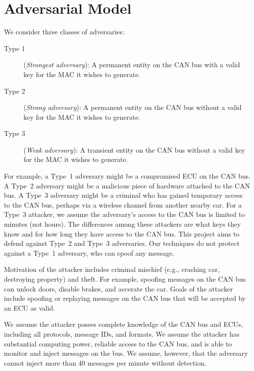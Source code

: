 \section{Adversarial Model}
\label{adversary}

We consider three classes of adversaries:

\begin{description}

	\item [Type 1]
	(\textit{Strongest adversary}): A permanent entity on the CAN bus with a valid key for the MAC it wishes to generate.
	
	\item [Type 2]
	(\textit{Strong adversary}): A permanent entity on the CAN bus without a valid key for the MAC it wishes to generate.
	
	\item [Type 3]
	(\textit{Weak adversary}): A transient entity on the CAN bus without a valid key for the MAC it wishes to generate.
	
\end{description}

For example, a Type~1 adversary might be a compromised ECU on the CAN bus.  A Type~2 adversary might be a malicious piece of hardware attached
to the CAN bus.  A Type~3 adversary might be a criminal who has gained temporary access to the CAN bus, perhaps via a wireless channel from
another nearby car.  For a Type~3 attacker, we assume the adversary's access to the CAN bus is limited to minutes (not hours).  
The differences among these attackers are what keys they know and for how long they have access to the CAN bus.
This project aims to defend against Type~2 and Type~3 adversaries.   Our techniques do not protect against 
a Type~1 adversary, who can spoof any message. 

Motivation of the attacker includes criminal mischief (e.g., crashing car, destroying property) and theft.  
For example, spoofing messages on the CAN bus can unlock doors, disable brakes, and accerate the car.
Goals of the attacker include spoofing or replaying messages on the CAN bus that will be accepted by an ECU
as valid.

We assume the attacker posses complete knowledge of the CAN bus and ECUs, including all protocols, message IDs, and formats.
We assume the attacker has substantial computing power, reliable access to the CAN bus, and is able to 
monitor and inject messages on the bus.  We assume, however, that the adversary cannot inject more than 40 messages
per minute without detection.

